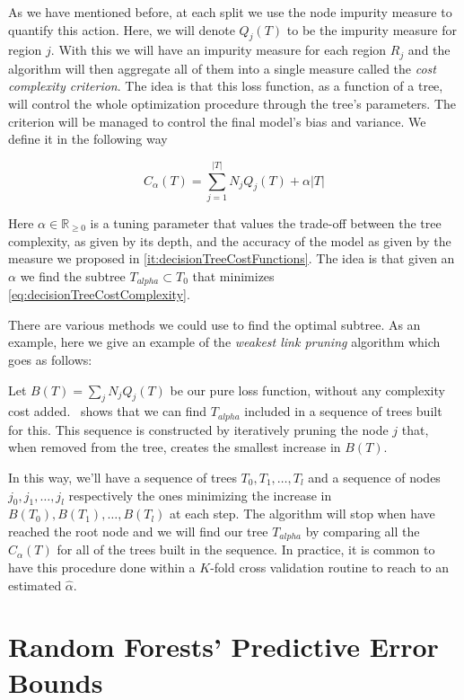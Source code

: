 \begin{appendices}
As we have mentioned before, at each split we use the node impurity measure to quantify this action. Here, we will denote $Q_j(T)$ to be the impurity measure for region $j$. 
With this we will have an impurity measure for each region $R_j$ and the algorithm will then aggregate all of them into a single measure called the \textit{cost complexity criterion}. The idea is that this loss function, as a function of a tree, will control the whole optimization procedure through the tree's parameters. The criterion will be managed to control the final model's bias and variance. We define it in the following way

\begin{equation}
C_\alpha(T) = \sum_{j=1}^{|T|} N_j Q_j(T) + \alpha|T|
\end{equation}\label{eq:decisionTreeCostComplexity}


Here $\alpha \in \mathbb{R}_{\geq 0}$ is a tuning parameter that values the trade-off between the tree complexity, as given by its depth, and the accuracy of the model as given by the measure we proposed in \cref{it:decisionTreeCostFunctions}. The idea is that given an $\alpha$ we find the subtree $T_{alpha} \subset T_0$ that minimizes \cref{eq:decisionTreeCostComplexity}.

There are various methods we could use to find the optimal subtree. As an example, here we give an example of the \textit{weakest link pruning} algorithm which goes as follows:

Let $B(T) = \sum_{j} N_j Q_j(T) $ be our pure loss function, without any complexity cost added.~\cite{breiman-cart84} shows that we can find $T_{alpha}$ included in a sequence of trees built for this. This sequence is constructed by iteratively pruning the node $j$ that, when removed from the tree, creates the smallest increase in $B(T)$.


In this way, we'll have a sequence of trees $T_0,T_1,\ldots,T_l$ and a sequence of nodes $j_0, j_1,\ldots,j_l$ respectively the ones minimizing the increase in $B(T_0),B(T_1),\ldots,B(T_l)$ at each step. The algorithm will stop when have reached the root node and we will find our tree $T_{alpha}$ by comparing all the $C_\alpha(T)$ for all of the trees built in the sequence. In practice, it is common to have this procedure done within a $K$-fold cross validation routine to reach to an estimated $\hat{\alpha}$.


\section{Random Forests' Predictive Error Bounds}\label{appx:sec:rforest_predictive_error_bounds}



\end{appendices}
